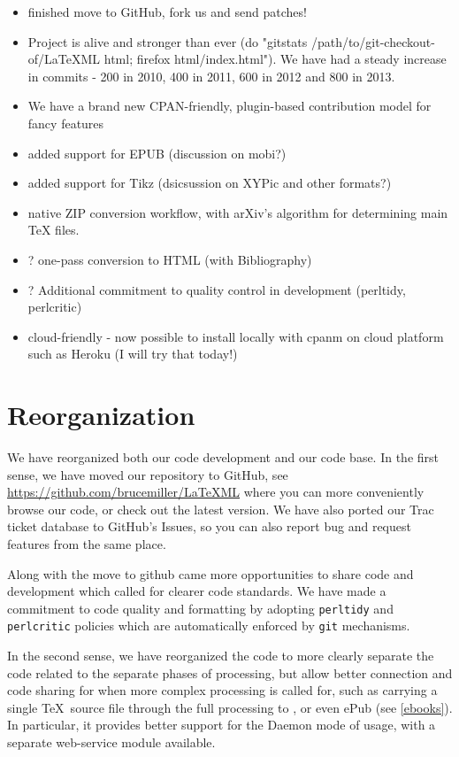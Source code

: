 \documentclass{llncs}
\begin{document}
\begin{itemize}
\item finished move to GitHub, fork us and send patches!
\item Project is alive and stronger than ever (do "gitstats /path/to/git-checkout-of/LaTeXML html; firefox html/index.html"). We have had a steady increase in commits - 200 in 2010, 400 in 2011, 600 in 2012 and 800 in 2013.
\item We have a brand new CPAN-friendly, plugin-based contribution model for fancy features
\item added support for EPUB (discussion on mobi?)
\item added support for Tikz (dsicsussion on XYPic and other formats?)
\item native ZIP conversion workflow, with arXiv's algorithm for determining main TeX files.
\item ? one-pass conversion to HTML (with Bibliography)
\item ? Additional commitment to quality control in development (perltidy, perlcritic)
\item cloud-friendly - now possible to install locally with cpanm on cloud platform such as Heroku (I will try that today!) 
\end{itemize}

\section{Reorganization}\label{reorganization}
We have reorganized both our code development and our code base.
In the first sense, we have moved our repository to GitHub,
see \url{https://github.com/brucemiller/LaTeXML}
where you can more conveniently browse our code, or check out the latest version.
We have also ported our Trac ticket database to GitHub's Issues,
so you can also report bug and request features from the same place.

Along with the move to github came more opportunities to share
code and development which called for clearer code standards.
We have made a commitment to code quality and formatting by
adopting \texttt{perltidy} and \texttt{perlcritic} policies
which are automatically enforced by \texttt{git} mechanisms.

In the second sense, we have reorganized the code to more clearly
separate the code related to the separate phases of processing,
but allow better connection and code sharing for when more
complex processing is called for, such as carrying a single \TeX\ source
file through the full processing to \HTML, or even ePub (see \ref{ebooks}).
In particular, it provides better support for the Daemon mode of
usage, with a separate web-service module available.
\end{document}
